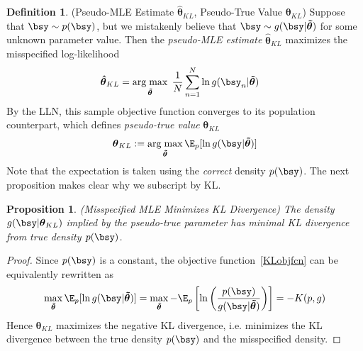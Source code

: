 \documentclass[12pt]{article}
\theoremstyle{plain}
\newtheorem{prop}[thm]{Proposition}
\theoremstyle{definition}
\newtheorem{defn}[thm]{Definition}
\theoremstyle{remark}
\newcommand{\bstheta}{\boldsymbol{\theta}}
\newcommand{\bshattheta}{\boldsymbol{\hat{\theta}}}
\newcommand{\bstildetheta}{\boldsymbol{\tilde{\theta}}}
\DeclareMathOperator*{\argmax}{arg\;max}
\newcommand{\sumnN}{\sum^N_{n=1}}
\begin{document}
\begin{defn}
\label{defn:misspecmle}
(Pseudo-MLE Estimate $\bshattheta_{KL}$, Pseudo-True Value $\bstheta_{KL}$)
Suppose that $\bsy\sim p(\bsy)$, but we mistakenly believe that
$\bsy\sim g(\bsy|\bstildetheta)$ for some unknown parameter value.
Then the \emph{pseudo-MLE estimate} $\bshattheta_{KL}$ maximizes the
misspecified log-likelihood
\begin{align*}
  \bshattheta_{KL}
  &=
  \argmax_{\bstildetheta}\;
  \frac{1}{N} \sumnN
  \ln g(\bsy_n|\bstildetheta)
\end{align*}
By the LLN, this sample objective function converges to its population
counterpart, which defines \emph{pseudo-true value} $\bstheta_{KL}$
\begin{align}
  \bstheta_{KL}
  :=
  \argmax_{\bstildetheta}
  \E_p[\ln g(\bsy|\bstildetheta)]
  \label{KLobjfcn}
\end{align}
Note that the expectation is taken using the \emph{correct} density
$p(\bsy)$.
The next proposition makes clear why we subscript by KL.
\end{defn}

\begin{prop}\emph{(Misspecified MLE Minimizes KL Divergence)}
The density $g(\bsy|\bstheta_{KL})$ implied by the pseudo-true parameter
has minimal KL divergence from true density $p(\bsy)$.
\end{prop}

\begin{proof}
Since $p(\bsy)$ is a constant, the objective function~\ref{KLobjfcn} can
be equivalently rewritten as
\begin{align*}
  \max_{\bstildetheta}
  \E_p[\ln g(\bsy|\bstildetheta)]
  =
  \max_{\bstildetheta}
  -\E_p\left[\ln \left(\frac{p(\bsy)}{g(\bsy|\bstildetheta)}\right)\right]
  =
  -K(p,g)
\end{align*}
Hence $\bstheta_{KL}$ maximizes the negative KL divergence, i.e.
minimizes the KL divergence between the true density $p(\bsy)$ and the
misspecified density.
\end{proof}
\end{document}
